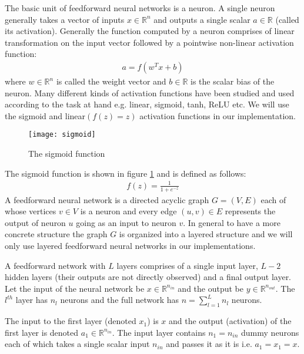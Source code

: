 The basic unit of feedforward neural networks is a neuron. A single neuron generally takes a vector of inputs $x \in \mathbb{R}^n$ and outputs a single scalar $a \in \mathbb{R}$ (called its activation). Generally the function computed by a neuron comprises of linear transformation on the input vector followed by a pointwise non-linear activation function:
\begin{align}
a = f(w^T x + b)
\end{align}
where $w \in \mathbb{R}^n$ is called the weight vector and $b \in \mathbb{R}$ is the scalar bias of the neuron.
Many different kinds of activation functions have been studied and used according to the task at hand e.g. linear, sigmoid, tanh, ReLU etc. We will use the sigmoid and linear$(f(z) = z)$ activation functions in our implementation.

\begin{figure}[ht]
\begin{center}
\centerline{\texttt{[image: sigmoid]}}
\caption{The sigmoid function}
\label{fig:sigmoid}
\end{center}
\vskip -0.4in
\end{figure}

The sigmoid function is shown in figure \ref{fig:sigmoid} and is defined as follows:
\begin{align}
f(z) = \frac{1}{1 + e^{-z}}
\end{align}
A feedforward neural network is a directed acyclic graph $G = (V,E)$ each of whose vertices $v \in V$ is a neuron and every edge $(u,v) \in E$ represents the output of neuron $u$ going as an input to neuron $v$. In general to have a more concrete structure the graph $G$ is organized into a layered structure and we will only use layered feedforward neural networks in our implementations. 

A feedforward network with $L$ layers comprises of a single input layer, $L-2$ hidden layers (their outputs are not directly observed) and a final output layer.
Let the input of the neural network be $x \in \mathbb{R}^{n_{in}}$ and the output be $y \in \mathbb{R}^{n_{out}}$.
The $l^{th}$ layer has $n_l$ neurons and the full network has $n = \sum_{l=1}^L n_l$ neurons.

The input to the first layer (denoted $x_1$) is $x$ and the output (activation) of the first layer is denoted $a_1 \in \mathbb{R}^{n_{in}}$. The input layer contains $n_1 = n_{in}$ dummy neurons each of which takes a single scalar input $n_{in}$ and passes it as it is i.e. $a_1 = x_1 = x$.

